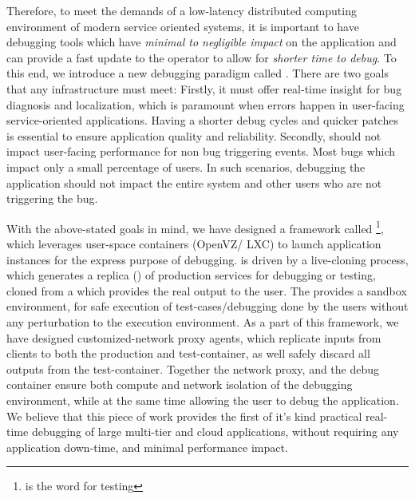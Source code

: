 Therefore, to meet the demands of a low-latency distributed computing environment of modern service oriented systems, it is important to have debugging tools which have \textit{minimal to negligible impact} on the application and can provide a fast update to the operator to allow for \textit{shorter time to debug}.
To this end, we introduce a new debugging paradigm called \livedebugging.
There are two goals that any \livedebugging infrastructure must meet:
Firstly, it must offer real-time insight for bug diagnosis and localization, which is paramount when errors happen in user-facing service-oriented applications. 
Having a shorter debug cycles and quicker patches is essential to ensure application quality and reliability.
Secondly, \livedebugging should not impact user-facing performance for non bug triggering events.
Most bugs which impact only a small percentage of users. In such scenarios, debugging the application should not impact the entire system and other users who are not triggering the bug.

With the above-stated goals in mind, we have designed a framework called \parikshan\footnote{\parikshan is the \toolNameLang word for  testing}, which leverages user-space containers (OpenVZ/ LXC) to launch application instances for the express purpose of debugging. 
\parikshan is driven by a  live-cloning process, which generates a replica (\debugcontainer) of production services for debugging or testing, cloned from a \productioncontainer which provides the real output to the user.
The \debugcontainer provides a sandbox environment, for safe execution of test-cases/debugging done by the users without any perturbation to the execution environment.
As a part of this framework, we have designed customized-network proxy agents, which replicate inputs from clients to both the production and test-container, as well safely discard all outputs from the test-container.
Together the network proxy, and the debug container ensure both compute and network isolation of the debugging environment, while at the same time allowing the user to debug the application.
We believe that this piece of work provides the first of it's kind practical real-time debugging of large multi-tier and cloud applications, without requiring any application down-time, and minimal performance impact.

